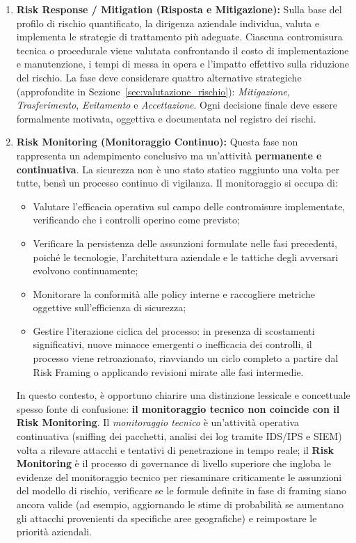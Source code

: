 \documentclass[../../main.tex]{subfiles}
\begin{document}
\begin{enumerate}
    \item \textbf{Risk Response / Mitigation (Risposta e Mitigazione):} Sulla base del profilo di rischio quantificato, la dirigenza aziendale individua, valuta e implementa le strategie di trattamento più adeguate. Ciascuna contromisura tecnica o procedurale viene valutata confrontando il costo di implementazione e manutenzione, i tempi di messa in opera e l'impatto effettivo sulla riduzione del rischio. La fase deve considerare quattro alternative strategiche (approfondite in Sezione~\ref{sec:valutazione_rischio}): \textit{Mitigazione}, \textit{Trasferimento}, \textit{Evitamento} e \textit{Accettazione}. Ogni decisione finale deve essere formalmente motivata, oggettiva e documentata nel registro dei rischi.
    
    \item \textbf{Risk Monitoring (Monitoraggio Continuo):} Questa fase non rappresenta un adempimento conclusivo ma un'attività \textbf{permanente e continuativa}. La sicurezza non è uno stato statico raggiunto una volta per tutte, bensì un processo continuo di vigilanza. Il monitoraggio si occupa di:
    \begin{itemize}
        \item Valutare l'efficacia operativa sul campo delle contromisure implementate, verificando che i controlli operino come previsto;
        \item Verificare la persistenza delle assunzioni formulate nelle fasi precedenti, poiché le tecnologie, l'architettura aziendale e le tattiche degli avversari evolvono continuamente;
        \item Monitorare la conformità alle policy interne e raccogliere metriche oggettive sull'efficienza di sicurezza;
        \item Gestire l'iterazione ciclica del processo: in presenza di scostamenti significativi, nuove minacce emergenti o inefficacia dei controlli, il processo viene retroazionato, riavviando un ciclo completo a partire dal Risk Framing o applicando revisioni mirate alle fasi intermedie.
    \end{itemize}
    In questo contesto, è opportuno chiarire una distinzione lessicale e concettuale spesso fonte di confusione: \textbf{il monitoraggio tecnico non coincide con il Risk Monitoring}. Il \textit{monitoraggio tecnico} è un'attività operativa continuativa (sniffing dei pacchetti, analisi dei log tramite IDS/IPS e SIEM) volta a rilevare attacchi e tentativi di penetrazione in tempo reale; il \textbf{Risk Monitoring} è il processo di governance di livello superiore che ingloba le evidenze del monitoraggio tecnico per riesaminare criticamente le assunzioni del modello di rischio, verificare se le formule definite in fase di framing siano ancora valide (ad esempio, aggiornando le stime di probabilità se aumentano gli attacchi provenienti da specifiche aree geografiche) e reimpostare le priorità aziendali.
\end{enumerate}
\end{document}

